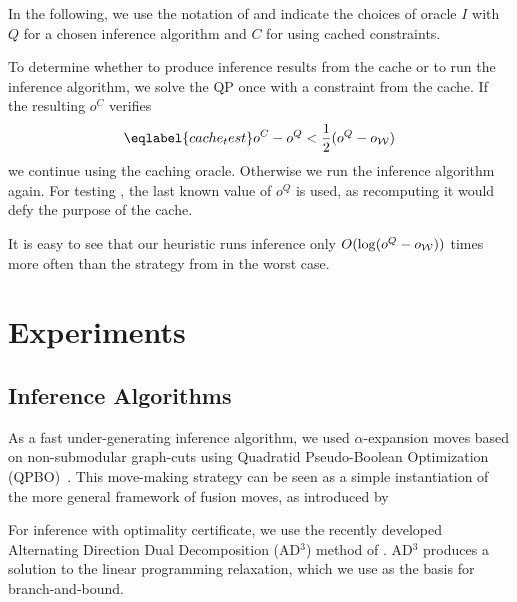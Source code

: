
In the following, we use the notation of  and indicate
the choices of oracle $I$ with $Q$ for a chosen inference algorithm and $C$ for
using cached constraints.

To determine whether to produce inference results from the cache or to run the inference algorithm,
we solve the QP once with a constraint from the cache. If the resulting $o^C$ verifies
\begin{equation}\eqlabel{cache_test}
    o^C - o^Q < \frac{1}{2} (o^Q - o_{\W})
\end{equation}
we continue using the caching oracle. Otherwise we run the inference algorithm again.
For testing , the last known value of $o^Q$ is used, as recomputing it would defy
the purpose of the cache.

It is easy to see that our heuristic runs inference only $O(\log(o^Q -
o_{\mathcal{W}}))$ times more often than the strategy from \citet{joachims2009cutting} in the
worst case.


\section{Experiments}

\subsection{Inference Algorithms}

As a fast under-generating inference algorithm, we used $\alpha$-expansion
moves based on non-submodular graph-cuts using Quadratid Pseudo-Boolean
Optimization (QPBO)~\citep{rother2007optimizing}.  This move-making strategy
can be seen as a simple instantiation of the more general framework of fusion
moves, as introduced by \citet{lempitsky2010fusion}

For inference with optimality certificate, we use the recently developed
Alternating Direction Dual Decomposition (AD$^3$) method of
\citet{martins2011augmented}. AD$^3$ produces a solution to the linear
programming relaxation, which we use as the basis for branch-and-bound.

